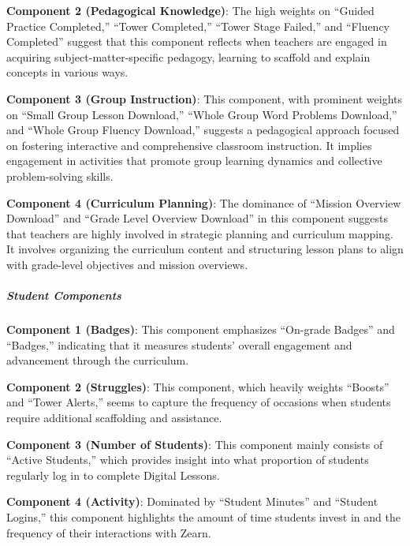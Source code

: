 \documentclass[
  number,
  preprint,
  3p,
  onecolumn]{elsarticle}
\let\oldsubparagraph\subparagraph
\renewcommand{\subparagraph}[1]{\oldsubparagraph{#1}\mbox{}}
\begin{document}
\textbf{Component 2 (Pedagogical Knowledge)}: The high weights on
``Guided Practice Completed,'' ``Tower Completed,'' ``Tower Stage
Failed,'' and ``Fluency Completed'' suggest that this component reflects
when teachers are engaged in acquiring subject-matter-specific pedagogy,
learning to scaffold and explain concepts in various ways.

\textbf{Component 3 (Group Instruction)}: This component, with prominent
weights on ``Small Group Lesson Download,'' ``Whole Group Word Problems
Download,'' and ``Whole Group Fluency Download,'' suggests a pedagogical
approach focused on fostering interactive and comprehensive classroom
instruction. It implies engagement in activities that promote group
learning dynamics and collective problem-solving skills.

\textbf{Component 4 (Curriculum Planning)}: The dominance of ``Mission
Overview Download'' and ``Grade Level Overview Download'' in this
component suggests that teachers are highly involved in strategic
planning and curriculum mapping. It involves organizing the curriculum
content and structuring lesson plans to align with grade-level
objectives and mission overviews.

\subparagraph{Student Components}\label{student-components}

\textbf{Component 1 (Badges)}: This component emphasizes ``On-grade
Badges'' and ``Badges,'' indicating that it measures students' overall
engagement and advancement through the curriculum.

\textbf{Component 2 (Struggles)}: This component, which heavily weights
``Boosts'' and ``Tower Alerts,'' seems to capture the frequency of
occasions when students require additional scaffolding and assistance.

\textbf{Component 3 (Number of Students)}: This component mainly
consists of ``Active Students,'' which provides insight into what
proportion of students regularly log in to complete Digital Lessons.

\textbf{Component 4 (Activity)}: Dominated by ``Student Minutes'' and
``Student Logins,'' this component highlights the amount of time
students invest in and the frequency of their interactions with Zearn.
\end{document}
